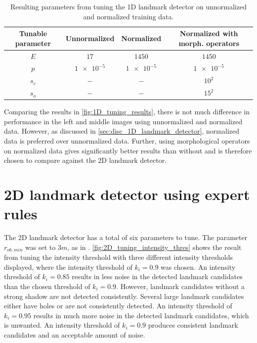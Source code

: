 \begin{table} [h]
    \caption{Resulting parameters from tuning the 1D landmark detector on unnormalized and normalized training data.}
    \centering
    \begin{tabular}{cccc}
        \hline
        \textbf{Tunable parameter} & \textbf{Unnormalized} & \textbf{Normalized} & \textbf{Normalized with morph. operators} \\ \hline
        $E$                        & $17$                  & $1450$              & $1450$                                    \\
        $p$                        & $\num{1e-5}$          & $\num{1e-5}$        & $\num{1e-5}$                              \\
        $s_c$                      & $-$                   & $-$                 & $10^2$                                    \\
        $s_o$                      & $-$                   & $-$                 & $15^2$                                    \\ \hline
    \end{tabular}
    \label{tab:1D_parameters}
\end{table}

Comparing the results in \cref{fig:1D_tuning_results}, there is not much difference in performance in the left and middle images using unnormalized and normalized data. However, as discussed in \cref{sec:disc_1D_landmark_detector}, normalized data is preferred over unnormalized data. Further, using morphological operators on normalized data gives significantly better results than without and is therefore chosen to compare against the 2D landmark detector.

\section{2D landmark detector using expert rules}

The 2D landmark detector has a total of six parameters to tune. The parameter $r_{ob, min}$ was set to $3 m $, as in \cite{Leblond2019SonarProject}. \cref{fig:2D_tuning_intensity_thres} shows the result from tuning the intensity threshold with three different intensity thresholds displayed, where the intensity threshold of $k_i = 0.9$ was chosen. An intensity threshold of $k_i = 0.85$ results in less noise in the detected landmark candidates than the chosen threshold of $k_i = 0.9$. However, landmark candidates without a strong shadow are not detected consistently. Several large landmark candidates either have holes or are not consistently detected. An intensity threshold of $k_i = 0.95$ results in much more noise in the detected landmark candidates, which is unwanted. An intensity threshold of $k_i = 0.9$ produces consistent landmark candidates and an acceptable amount of noise. 

